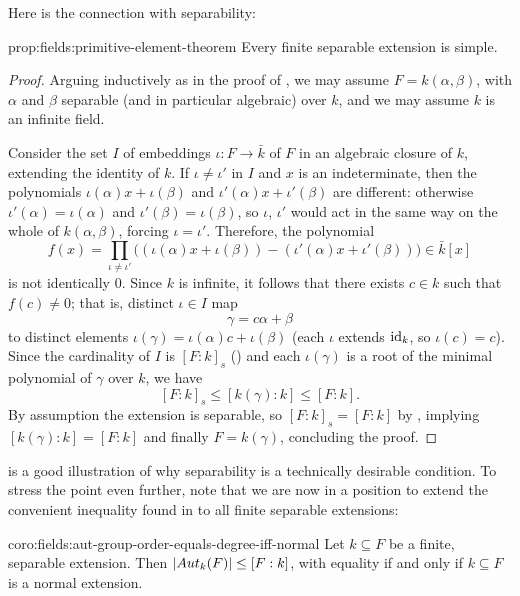 Here is the connection with separability:
\begin{prop}{}{prop:fields:primitive-element-theorem}
  Every finite separable extension is simple.
\end{prop}
\begin{proof}
  Arguing inductively as in the proof of , we
  may assume $F = k(\alpha, \beta)$, with $\alpha$ and $\beta$
  separable (and in particular algebraic) over $k$, and we may assume
  $k$ is an infinite field.

  Consider the set $I$ of embeddings $\iota : F \to \bar{k}$ of $F$ in
  an algebraic closure of $k$, extending the identity of $k$. If
  $\iota \neq \iota'$ in $I$ and $x$ is an indeterminate, then the
  polynomials $\iota(\alpha) x + \iota(\beta)$ and
  $\iota'(\alpha) x + \iota'(\beta)$ are different: otherwise
  $\iota'(\alpha) = \iota(\alpha)$ and $\iota'(\beta) = \iota(\beta)$,
  so $\iota$, $\iota'$ would act in the same way on the whole of
  $k(\alpha, \beta)$, forcing $\iota = \iota'$.  Therefore, the
  polynomial
  \[
    f(x) = \prod_{\iota \neq \iota'} \bigl((\iota(\alpha)x +
    \iota(\beta)) - (\iota'(\alpha)x + \iota'(\beta))\bigr) \in
    \bar{k}[x]
  \]
  is not identically $0$. Since $k$ is infinite, it follows that there
  exists $c \in k$ such that $f(c) \neq 0$; that is, distinct
  $\iota \in I$ map
  \[
    \gamma = c\alpha + \beta
  \]
  to distinct elements $\iota(\gamma) = \iota(\alpha)c + \iota(\beta)$
  (each $\iota$ extends $\operatorname{id}_k$, so $\iota(c) = c$). Since the
  cardinality of $I$ is $[F : k]_s$ () and each
  $\iota(\gamma)$ is a root of the minimal polynomial of $\gamma$ over
  $k$, we have
  \[ [F : k]_s \leq [k(\gamma) : k] \leq [F : k].
  \]
  By assumption the extension is separable, so $[F : k]_s = [F : k]$
  by , implying $[k(\gamma) : k] = [F : k]$ and
  finally $F = k(\gamma)$, concluding the proof.
\end{proof}
 is a good illustration of why separability is
a technically desirable condition. To stress the point even further,
note that we are now in a position to extend the convenient inequality
found in  to all finite separable extensions:
\begin{coro}{}{coro:fields:aut-group-order-equals-degree-iff-normal}
  Let $k \subseteq F$ be a finite, separable extension. Then
  $|Aut_k(F)| \leq [F : k]$, with equality if and only if
  $k \subseteq F$ is a normal extension.
\end{coro}
